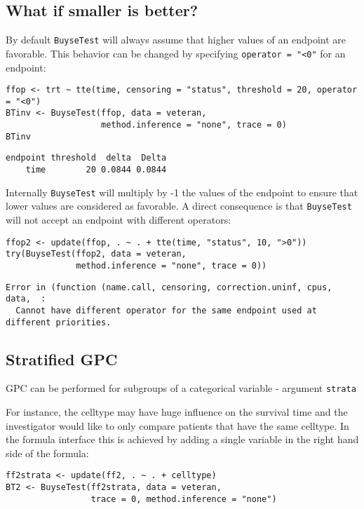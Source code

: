 \documentclass[12pt]{article}
\begin{document}
\clearpage

\subsection{What if smaller is better?}
\label{sec:org941a60e}
By default \texttt{BuyseTest} will always assume that higher values of an
endpoint are favorable. This behavior can be changed by specifying \texttt{operator = "<0"}
for an endpoint:
\lstset{language=r,label= ,caption= ,captionpos=b,numbers=none}
\begin{lstlisting}
ffop <- trt ~ tte(time, censoring = "status", threshold = 20, operator = "<0")
BTinv <- BuyseTest(ffop, data = veteran, 
				   method.inference = "none", trace = 0)
BTinv
\end{lstlisting}

\begin{verbatim}
endpoint threshold  delta  Delta
    time        20 0.0844 0.0844
\end{verbatim}

Internally \texttt{BuyseTest} will multiply by -1 the values of the endpoint
to ensure that lower values are considered as favorable. A direct
consequence is that \texttt{BuyseTest} will not accept an endpoint with
different operators:
\lstset{language=r,label= ,caption= ,captionpos=b,numbers=none}
\begin{lstlisting}
ffop2 <- update(ffop, . ~ . + tte(time, "status", 10, ">0"))
try(BuyseTest(ffop2, data = veteran, 
			  method.inference = "none", trace = 0))
\end{lstlisting}

\begin{verbatim}
Error in (function (name.call, censoring, correction.uninf, cpus, data,  : 
  Cannot have different operator for the same endpoint used at different priorities.
\end{verbatim}

\subsection{Stratified GPC}
\label{sec:org87cf7cd}

GPC can be performed for subgroups of a categorical variable \hfill -
argument \texttt{strata}

\bigskip

 For instance, the celltype may have huge influence on the survival
time and the investigator would like to only compare patients that
have the same celltype. In the formula interface this is achieved by
adding a single variable in the right hand side of the formula:
\lstset{language=r,label= ,caption= ,captionpos=b,numbers=none}
\begin{lstlisting}
ff2strata <- update(ff2, . ~ . + celltype)
BT2 <- BuyseTest(ff2strata, data = veteran, 
				 trace = 0, method.inference = "none")
\end{lstlisting}
\end{document}
